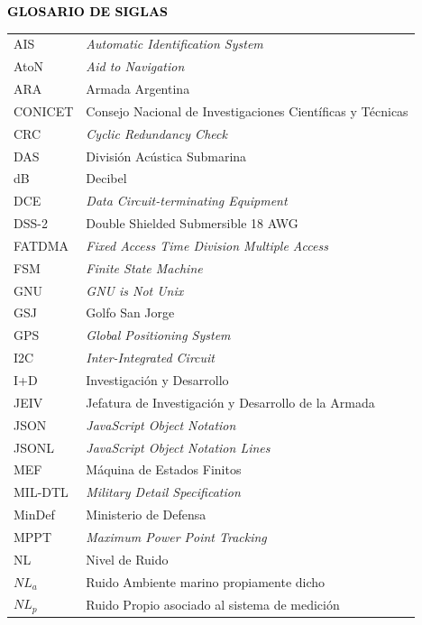 \begin{center}
	\Large\textbf{{\textcolor{black}{GLOSARIO DE SIGLAS}}}
\end{center}
\begin{tabular}{l p{12cm}}
  AIS		& \textit{Automatic Identification System}\\
  AtoN		& \textit{Aid to Navigation}\\  
  ARA		& Armada Argentina\\
  CONICET 	& Consejo Nacional de Investigaciones Científicas y Técnicas\\
  CRC		& \textit{Cyclic Redundancy Check}\\
  DAS		& División Acústica Submarina\\ 
  dB		& Decibel\\  
  DCE		& \textit{Data Circuit-terminating Equipment} \\  
  DSS-2		& Double Shielded Submersible 18 AWG\\  
  FATDMA	& \textit{Fixed Access Time Division Multiple Access}\\	  
  FSM 		& \textit{Finite State Machine}\\  
  GNU		& \textit{GNU is Not Unix}\\	  
  GSJ 		& Golfo San Jorge\\
  GPS		& \textit{Global Positioning System}\\
  I2C		& \textit{Inter-Integrated Circuit}\\  
  I+D		& Investigación y Desarrollo\\
  JEIV		& Jefatura de Investigación y Desarrollo de la Armada\\	  
  JSON		& \textit{JavaScript Object Notation}\\
  JSONL		& \textit{JavaScript Object Notation Lines}\\  
  MEF		& Máquina de Estados Finitos\\ 
  MIL-DTL	& \textit{Military Detail Specification}\\  
  MinDef  	& Ministerio de Defensa\\  
  MPPT		& \textit{Maximum Power Point Tracking}\\  
  NL 		& Nivel de Ruido\\
  $NL_{a}$ 	& Ruido Ambiente marino propiamente dicho\\
  $NL_{p}$ 	& Ruido Propio asociado al sistema de medición\\

\end{tabular}
